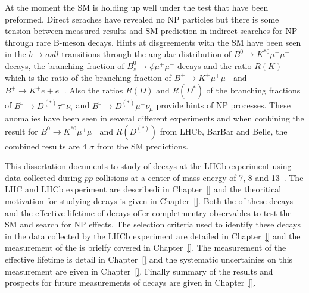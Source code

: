 At the moment the SM is holding up well under the test that have been preformed. Direct seraches have revealed no NP particles but there is some tension between measured results and SM prediction in indirect searches for NP through rare B-meson decays. Hints at disgreements with the SM have been seen in the $b \to a sll$ transitions through the angular distribution of $B^0 \to K^{*0} \mu^{+} \mu^{-}$ decays, the branching fraction of $B^{0}_{s} \to \phi  \mu^{+} \mu^{-}$ decays and the ratio $R(K)$ which is the ratio of the branching fraction of $B^+ \to K^+ \mu^{+} \mu^{-}$ and $B^+ \to K^+ e{+} e^{-}$. Also the ratios $R(D)$ and $R(D^*)$ of the branching fractions of $B^0 \to D^{(*)} \tau^{-} \nu_{\tau}$ and $B^0 \to D^{(*)} \mu^{-} \nu_{\mu}$ provide hints of NP processes. These anomalies have been seen in several different experiments and when conbining the result for $B^0 \to K^{*0} \mu^{+} \mu^{-}$ and $R(D^{(*)})$ from LHCb, BarBar and Belle, the combined results are 4 $\sigma$ from the SM predictions.


This dissertation documents to study of \bmumu decays at the LHCb experiment using data collected during $pp$ collisions at a center-of-mass energy of 7, 8 and 13~\tev. The LHC and LHCb experiment are describedi in Chapter~\ref{} and the theoritical motivation for studying \bmumu decays is given in Chapter~\ref{}. Both the \BF of these decays and the effective lifetime of \bsmumu decays offer completmentry observables to test the SM and search for NP effects. The selection criteria used to identify these decays in the data collected by the LHCb experiment are detailed in Chapter~\ref{} and the measurement of the \BF is brielfy covered in Chapter~\ref{}. The measurement of the effective lifetime is detail in Chapter~\ref{} and the systematic uncertainies on this measurement are given in Chapter~\ref{}. Finally summary of the results and prospects for future measurements of \bmumu decays are given in Chapter~\ref{}.


